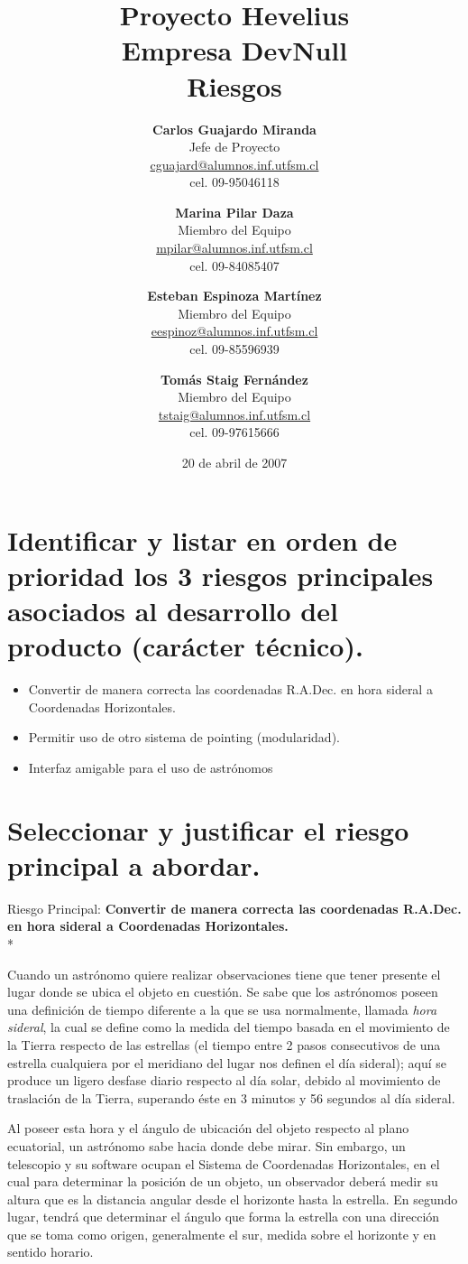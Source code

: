 \documentclass[letterpaper,spanish,10pt]{article}
\title{{\Huge \bf Proyecto Hevelius} \\ {\Large Empresa DevNull} \\ {\small Riesgos}}
\author{
{\bf Carlos Guajardo Miranda} \\ Jefe de Proyecto \\ \url{cguajard@alumnos.inf.utfsm.cl} \\ cel. 09-95046118 
\and
{\bf Marina Pilar Daza} \\ Miembro del Equipo \\ \url{mpilar@alumnos.inf.utfsm.cl} \\ cel. 09-84085407
\and
{\bf Esteban Espinoza Mart\'inez} \\ Miembro del Equipo \\ \url{eespinoz@alumnos.inf.utfsm.cl} \\ cel. 09-85596939
\and
{\bf Tom\'as Staig Fern\'andez} \\ Miembro del Equipo \\ \url{tstaig@alumnos.inf.utfsm.cl} \\ cel. 09-97615666
}
\date{20 de abril de 2007}
\begin{document}
\maketitle


%
%
\newpage

\section{Identificar y listar en orden de prioridad los 3 riesgos principales asociados al desarrollo del producto (car\'acter t\'ecnico).}

\begin{itemize}
	\item Convertir de manera correcta las coordenadas R.A.Dec. en hora sideral a Coordenadas Horizontales.
	\item Permitir uso de otro sistema de pointing (modularidad).
	\item Interfaz amigable para el uso de astr\'onomos
\end{itemize}


\section{Seleccionar y justificar el riesgo principal a abordar.}

Riesgo Principal: \textbf{Convertir de manera correcta las coordenadas R.A.Dec. en hora sideral a Coordenadas Horizontales.}\\*

Cuando un astr\'onomo quiere realizar observaciones tiene que tener presente el lugar donde se ubica el objeto en cuesti\'on.
Se sabe que los astr\'onomos poseen una definici\'on de tiempo diferente a la que se usa normalmente, llamada \textit{hora sideral},
la cual se define como la medida del tiempo basada en el movimiento de la Tierra respecto de las estrellas (el tiempo entre 2 
pasos consecutivos de una estrella cualquiera por el meridiano del lugar nos definen el d\'ia sideral); aqu\'i se produce un 
ligero desfase diario respecto al d\'ia solar, debido al movimiento de traslaci\'on de la Tierra, superando \'este en 3 minutos 
y 56 segundos al d\'ia sideral.

Al poseer esta hora y el \'angulo de ubicaci\'on del objeto respecto al plano ecuatorial, un astr\'onomo sabe hacia donde debe mirar. 
Sin embargo, un telescopio y su software ocupan el Sistema de Coordenadas Horizontales, en el cual para determinar la posici\'on de 
un objeto, un observador deber\'a medir su altura que es la distancia angular desde el horizonte hasta la estrella. En segundo lugar, 
tendr\'a que determinar el \'angulo que forma la estrella con una direcci\'on que se toma como origen, generalmente el sur, medida 
sobre el horizonte y en sentido horario.
\end{document}
